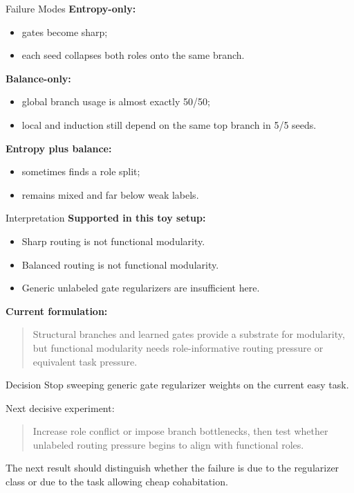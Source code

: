 \documentclass[aspectratio=169]{beamer}
\begin{document}
\begin{frame}{Failure Modes}
  \textbf{Entropy-only:}
  \begin{itemize}
    \item gates become sharp;
    \item each seed collapses both roles onto the same branch.
  \end{itemize}

  \vspace{0.5em}
  \textbf{Balance-only:}
  \begin{itemize}
    \item global branch usage is almost exactly 50/50;
    \item local and induction still depend on the same top branch in 5/5 seeds.
  \end{itemize}

  \vspace{0.5em}
  \textbf{Entropy plus balance:}
  \begin{itemize}
    \item sometimes finds a role split;
    \item remains mixed and far below weak labels.
  \end{itemize}
\end{frame}

\begin{frame}{Interpretation}
  \textbf{Supported in this toy setup:}
  \begin{itemize}
    \item Sharp routing is not functional modularity.
    \item Balanced routing is not functional modularity.
    \item Generic unlabeled gate regularizers are insufficient here.
  \end{itemize}

  \vspace{0.6em}
  \textbf{Current formulation:}
  \begin{quote}
    Structural branches and learned gates provide a substrate for modularity, but
    functional modularity needs role-informative routing pressure or equivalent
    task pressure.
  \end{quote}
\end{frame}

\begin{frame}{Decision}
  Stop sweeping generic gate regularizer weights on the current easy task.

  \vspace{0.8em}
  Next decisive experiment:
  \begin{quote}
    Increase role conflict or impose branch bottlenecks, then test whether
    unlabeled routing pressure begins to align with functional roles.
  \end{quote}

  \vspace{0.8em}
  The next result should distinguish whether the failure is due to the regularizer
  class or due to the task allowing cheap cohabitation.
\end{frame}
\end{document}
